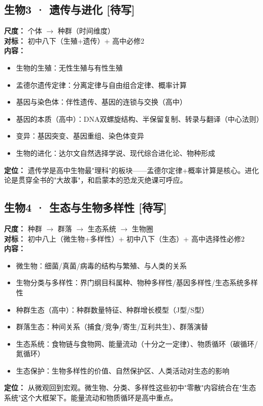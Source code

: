 \documentclass[a4paper,12pt]{ctexart}
\newcommand{\plan}{\textcolor{planblue}{\textbf{[待写]}}}
\begin{document}
\subsection*{生物3 · 遗传与进化 \plan}

\textbf{尺度：} 个体 $\rightarrow$ 种群（时间维度）\\
\textbf{对标：} 初中八下（生殖+遗传）+ 高中必修2\\
\textbf{内容：}
\begin{itemize}
  \item 生物的生殖：无性生殖与有性生殖
  \item 孟德尔遗传定律：分离定律与自由组合定律、概率计算
  \item 基因与染色体：伴性遗传、基因的连锁与交换（高中）
  \item 基因的本质（高中）：DNA双螺旋结构、半保留复制、转录与翻译（中心法则）
  \item 变异：基因突变、基因重组、染色体变异
  \item 生物的进化：达尔文自然选择学说、现代综合进化论、物种形成
\end{itemize}
\textbf{定位：} 遗传学是高中生物最"理科"的板块——孟德尔定律+概率计算是核心。进化论是贯穿全书的"大故事"，和启蒙本的恐龙灭绝课可呼应。

\subsection*{生物4 · 生态与生物多样性 \plan}

\textbf{尺度：} 种群 $\rightarrow$ 群落 $\rightarrow$ 生态系统 $\rightarrow$ 生物圈\\
\textbf{对标：} 初中八上（微生物+多样性）+ 初中八下（生态）+ 高中选择性必修2\\
\textbf{内容：}
\begin{itemize}
  \item 微生物：细菌/真菌/病毒的结构与繁殖、与人类的关系
  \item 生物分类与多样性：界门纲目科属种、物种多样性/基因多样性/生态系统多样性
  \item 种群生态（高中）：种群数量特征、种群增长模型（J型/S型）
  \item 群落生态：种间关系（捕食/竞争/寄生/互利共生）、群落演替
  \item 生态系统：食物链与食物网、能量流动（十分之一定律）、物质循环（碳循环/氮循环）
  \item 生态保护：生物多样性的价值、自然保护区、人类活动对生态的影响
\end{itemize}
\textbf{定位：} 从微观回到宏观。微生物、分类、多样性这些初中"零散"内容统合在"生态系统"这个大框架下。能量流动和物质循环是高中重点。
\end{document}
